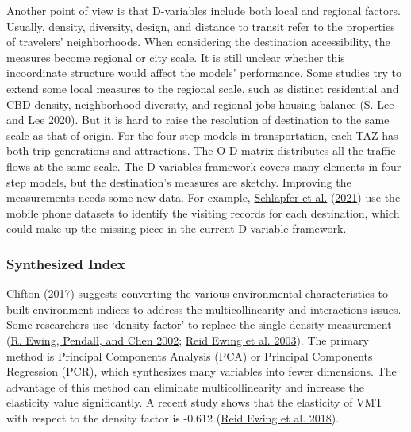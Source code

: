 \documentclass[
  12pt,
]{article}
\begin{document}
Another point of view is that D-variables include both local and regional factors. Usually, density, diversity, design, and distance to transit refer to the properties of travelers' neighborhoods. When considering the destination accessibility, the measures become regional or city scale. It is still unclear whether this incoordinate structure would affect the models' performance. Some studies try to extend some local measures to the regional scale, such as distinct residential and CBD density, neighborhood diversity, and regional jobs-housing balance (\protect\hyperlink{ref-leeComparingImpactsLocal2020}{S. Lee and Lee 2020}). But it is hard to raise the resolution of destination to the same scale as that of origin. For the four-step models in transportation, each TAZ has both trip generations and attractions. The O-D matrix distributes all the traffic flows at the same scale. The D-variables framework covers many elements in four-step models, but the destination's measures are sketchy. Improving the measurements needs some new data. For example, \protect\hyperlink{ref-schlapferUniversalVisitationLaw2021}{Schläpfer et al.} (\protect\hyperlink{ref-schlapferUniversalVisitationLaw2021}{2021}) use the mobile phone datasets to identify the visiting records for each destination, which could make up the missing piece in the current D-variable framework.

\hypertarget{synthesized-index}{%
\subsubsection{Synthesized Index}\label{synthesized-index}}

\protect\hyperlink{ref-cliftonGettingHereThere2017}{Clifton} (\protect\hyperlink{ref-cliftonGettingHereThere2017}{2017}) suggests converting the various environmental characteristics to built environment indices to address the multicollinearity and interactions issues. Some researchers use `density factor' to replace the single density measurement (\protect\hyperlink{ref-ewingMEASURINGSPRAWLITS2002}{R. Ewing, Pendall, and Chen 2002}; \protect\hyperlink{ref-ewingRelationshipUrbanSprawl2003}{Reid Ewing et al. 2003}). The primary method is Principal Components Analysis (PCA) or Principal Components Regression (PCR), which synthesizes many variables into fewer dimensions. The advantage of this method can eliminate multicollinearity and increase the elasticity value significantly. A recent study shows that the elasticity of VMT with respect to the density factor is -0.612 (\protect\hyperlink{ref-ewingTestingNewmanKenworthy2018}{Reid Ewing et al. 2018}).
\end{document}
